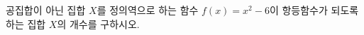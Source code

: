 \hspace*{2mm}\begin{minipage}[t]{\dimexpr\linewidth-2mm\relax}\vspace{0pt}
공집합이 아닌 집합 $X$를 정의역으로 하는 함수 $f(x)=x^2-6$이 항등함수가 되도록 하는 집합 $X$의 개수를 구하시오.\end{minipage}

